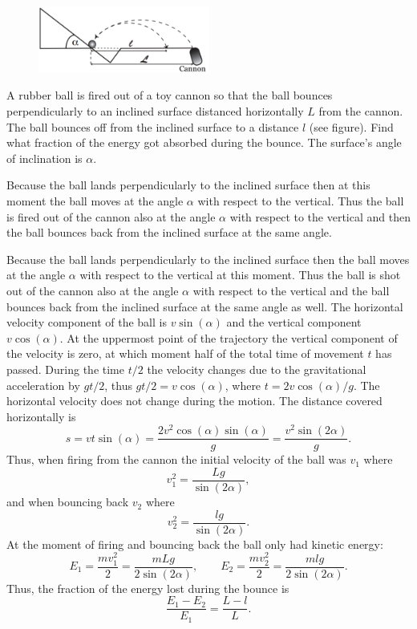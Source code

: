 {\ifEngStatement
\begin{figure}
  \vspace{-20pt}
  \begin{center}
    \includegraphics[width=0.5\textwidth]{2016-lahg-01-kaldjoonis_ing}
  \end{center}
  \vspace{-30pt}
\end{figure}
A rubber ball is fired out of a toy cannon so that the ball bounces perpendicularly to an inclined surface distanced horizontally $L$ from the cannon. The ball bounces off from the inclined surface to a distance $l$ (see figure). Find what fraction of the energy got absorbed during the bounce. The surface’s angle of inclination is $\alpha$.
\fi


\ifEngHint
Because the ball lands perpendicularly to the inclined surface then at this moment the ball moves at the angle $\alpha$ with respect to the vertical. Thus the ball is fired out of the cannon also at the angle $\alpha$ with respect to the vertical and then the ball bounces back from the inclined surface at the same angle.
\fi


\ifEngSolution
Because the ball lands perpendicularly to the inclined surface then the ball moves at the angle $\alpha$ with respect to the vertical at this moment. Thus the ball is shot out of the cannon also at the angle $\alpha$ with respect to the vertical and the ball bounces back from the inclined surface at the same angle as well. The horizontal velocity component of the ball is $v\sin(\alpha)$ and the vertical component $v\cos(\alpha)$. At the uppermost point of the trajectory the vertical component of the velocity is zero, at which moment half of the total time of movement $t$ has passed. During the time $t/2$ the velocity changes due to the gravitational acceleration by $gt/2$, thus $gt/2 =v\cos(\alpha)$, where $t=2v\cos(\alpha)/g$. The horizontal velocity does not change during the motion. The distance covered horizontally is
$$s=vt\sin(\alpha)=\frac{2v^2\cos(\alpha)\sin(\alpha)}{g} = \frac{v^2\sin(2\alpha)}{g}.$$ 
Thus, when firing from the cannon the initial velocity of the ball was $v_1$ where
\[ v_1^2 = \frac{Lg}{\sin(2\alpha)}, \] 
and when bouncing back $v_2$ where
\[ v_2^2 = \frac{lg}{\sin(2\alpha)}. \] 
At the moment of firing and bouncing back the ball only had kinetic energy:
\[ E_1 = \frac{mv_1^2}{2}=\frac{mLg}{2\sin(2\alpha)},\quad\quad E_2 =\frac{mv_2^2}{2} = \frac{mlg}{2\sin(2\alpha)}. \]
Thus, the fraction of the energy lost during the bounce is
\[ \frac{E_1-E_2}{E_1} = \frac{L-l}{L}. \]
\fi
}